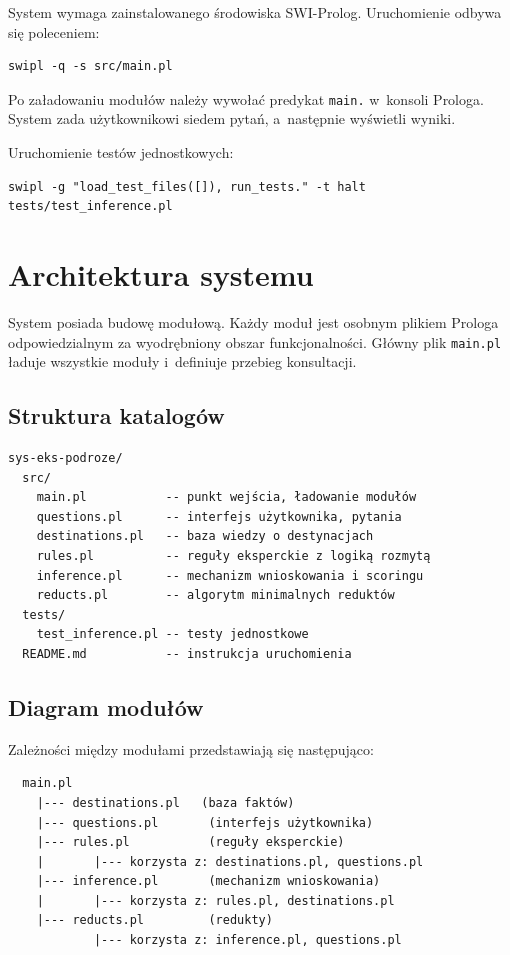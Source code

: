 \documentclass[12pt,a4paper]{article}
\begin{document}
System wymaga zainstalowanego środowiska SWI-Prolog. Uruchomienie odbywa się poleceniem:

\begin{lstlisting}[style=prolog, numbers=none]
swipl -q -s src/main.pl
\end{lstlisting}

Po załadowaniu modułów należy wywołać predykat \texttt{main.} w~konsoli Prologa. System zada użytkownikowi siedem pytań, a~następnie wyświetli wyniki.

Uruchomienie testów jednostkowych:

\begin{lstlisting}[style=prolog, numbers=none]
swipl -g "load_test_files([]), run_tests." -t halt tests/test_inference.pl
\end{lstlisting}

\section{Architektura systemu}

System posiada budowę modułową. Każdy moduł jest osobnym plikiem Prologa odpowiedzialnym za wyodrębniony obszar funkcjonalności. Główny plik \texttt{main.pl} ładuje wszystkie moduły i~definiuje przebieg konsultacji.

\subsection{Struktura katalogów}

\begin{verbatim}
sys-eks-podroze/
  src/
    main.pl           -- punkt wejścia, ładowanie modułów
    questions.pl      -- interfejs użytkownika, pytania
    destinations.pl   -- baza wiedzy o destynacjach
    rules.pl          -- reguły eksperckie z logiką rozmytą
    inference.pl      -- mechanizm wnioskowania i scoringu
    reducts.pl        -- algorytm minimalnych reduktów
  tests/
    test_inference.pl -- testy jednostkowe
  README.md           -- instrukcja uruchomienia
\end{verbatim}

\subsection{Diagram modułów}

Zależności między modułami przedstawiają się następująco:

\begin{verbatim}
  main.pl
    |--- destinations.pl   (baza faktów)
    |--- questions.pl       (interfejs użytkownika)
    |--- rules.pl           (reguły eksperckie)
    |       |--- korzysta z: destinations.pl, questions.pl
    |--- inference.pl       (mechanizm wnioskowania)
    |       |--- korzysta z: rules.pl, destinations.pl
    |--- reducts.pl         (redukty)
            |--- korzysta z: inference.pl, questions.pl
\end{verbatim}
\end{document}
